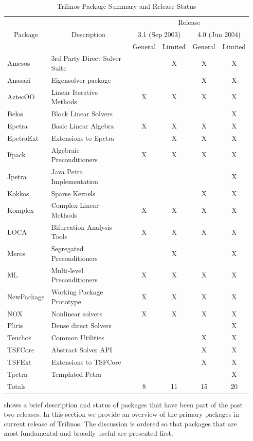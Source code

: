 \documentclass[12pt,relax]{TPA}
\begin{document}
\begin{table}
\begin{center}
\begin{tabular}{|l|l|c|c|c|c|}\hline
        &             & \multicolumn{4}{|c|}{Release} \\
\multicolumn{1}{|c|}{Package} &
\multicolumn{1}{|c|}{Description} &
\multicolumn{2}{|c|}{3.1 (Sep 2003)} &
\multicolumn{2}{|c|}{4.0 (Jun 2004)}\\
          &   & General & Limited &General &Limited \\\hline
Amesos& 3rd Party Direct Solver Suite  &  & X& X& X \\\hline
Anasazi& Eigensolver package           &  &  & X& X \\\hline
AztecOO& Linear Iterative Methods      & X& X& X& X \\\hline
Belos& Block Linear Solvers            &  &  &  & X \\\hline
Epetra& Basic Linear Algebra           & X& X& X& X \\\hline
EpetraExt& Extensions to Epetra        &  & X& X& X \\\hline
Ifpack& Algebraic Preconditioners      & X& X& X& X \\\hline
Jpetra& Java Petra Implementation      &  &  &  & X \\\hline
Kokkos& Sparse Kernels                 &  &  & X& X \\\hline
Komplex& Complex Linear Methods        & X& X& X& X \\\hline
LOCA& Bifurcation Analysis Tools       & X& X& X& X \\\hline
Meros& Segregated Preconditioners      &  & X&  & X \\\hline
ML& Multi-level Preconditioners        & X& X& X& X \\\hline
NewPackage& Working Package Prototype  & X& X& X& X \\\hline
NOX& Nonlinear solvers                 & X& X& X& X \\\hline
Pliris& Dense direct Solvers           &  &  &  & X \\\hline
Teuchos& Common Utilities              &  &  & X& X \\\hline
TSFCore& Abstract Solver API           &  &  & X& X \\\hline
TSFExt& Extensions to TSFCore          &  &  & X& X \\\hline
Tpetra& Templated Petra                &  &  &  & X \\\hline\hline
Totals&                                & 8&11&15&20 \\\hline
\end{tabular}
\caption{\label{Table:PackageList} Trilinos Package Summary and
Release Status}
\end{center}
\end{table}
shows a brief description and status of packages that have been part
of the past two releases.  
In this section we provide an overview of the primary packages in
current release of Trilinos.  The discussion is ordered so that
packages that are most fundamental and broadly useful are presented
first.
\end{document}
